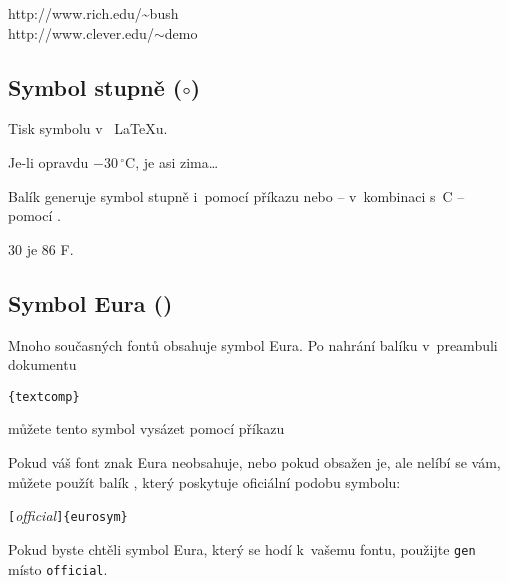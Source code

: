\begin{example}
http://www.rich.edu/\~{}bush \\
http://www.clever.edu/$\sim$demo
\end{example}  
 
\subsection{Symbol stupně \texorpdfstring{($\circ$)}{}}

Tisk symbolu  v~ \LaTeX u.

\begin{example}
Je-li opravdu
$-30\,^{\circ}\mathrm{C}$,
je asi zima\ldots
\end{example}

Balík  generuje symbol stupně i~pomocí příkazu
 nebo -- v~kombinaci s~C -- pomocí .

\begin{example}
30 \textcelsius{} je
86 \textdegree{}F.
\end{example}

\subsection{Symbol Eura \texorpdfstring{(\officialeuro)}{}}

Mnoho současných fontů obsahuje symbol Eura. Po nahrání balíku 
v~preambuli dokumentu
\begin{lscommand}
\verb|{textcomp}| 
\end{lscommand}
můžete tento symbol vysázet pomocí příkazu
\begin{lscommand}
\end{lscommand}

Pokud váš font znak Eura neobsahuje, nebo pokud obsažen je, ale nelíbí se vám,
můžete použít balík , který poskytuje oficiální podobu symbolu:
\begin{lscommand}
\verb|[|\emph{official}\verb|]{eurosym}|
\end{lscommand}
Pokud byste chtěli symbol Eura, který se hodí k~vašemu fontu, použijte
\texttt{gen} místo \texttt{official}.


